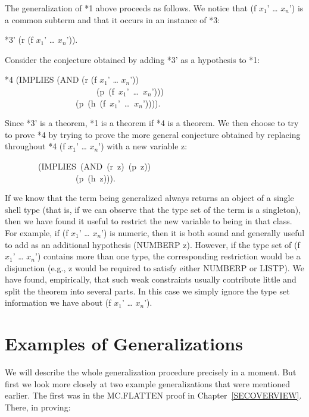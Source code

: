 \documentclass[10pt]{book}
\newenvironment{pubasis}{\begin{flushleft}}{\end{flushleft}}
\begin{document}
The generalization of *1 above proceeds as follows.
We notice that (f $x_{1}$' \ldots{} $x_{n}$') is a common subterm and that
it occurs in an instance of *3:
\begin{pubasis}
*3'	(r (f $x_{1}$' \ldots{} $x_{n}$')).\\
\end{pubasis}
Consider the conjecture obtained by adding *3' as a
hypothesis to *1:
\begin{pubasis}
*4	(IMPLIES (AND (r (f $x_{1}$' \ldots{} $x_{n}$'))\\
~~~~~~~~~~~~~~~~~~~~~~(p~(f~$x_{1}$'~\ldots{}~$x_{n}$')))\\
~~~~~~~~~~~~~~~~~(p~(h~(f~$x_{1}$'~\ldots{}~$x_{n}$')))).\\
\end{pubasis}
Since *3' is a theorem, *1 is a theorem if *4 is
a theorem.  We then choose to try to prove *4 by trying
to prove the more
general conjecture obtained by replacing throughout
*4 (f $x_{1}$' \ldots{} $x_{n}$') with a new variable z:
\begin{pubasis}
~~~~~~~~(IMPLIES~(AND~(r~z)~(p~z))\\
~~~~~~~~~~~~~~~~~(p~(h~z))).\\
\end{pubasis}
If we know that the term being generalized always
returns an object of a single shell type (that is, if we can observe
that the type set of the term is a singleton), then we have found it
useful to restrict the new variable to being in that class.
For example, if (f $x_{1}$' \ldots{} $x_{n}$') is numeric,
then it is both sound and generally useful to add as an additional
hypothesis (NUMBERP z).  However, if the type set of
(f $x_{1}$' \ldots{} $x_{n}$') contains more than one type,
the corresponding restriction would be a disjunction
(e.g., z would be  required
to satisfy either NUMBERP or LISTP).
We have found, empirically, that such weak constraints usually contribute little
and  split the theorem into several parts.  In this case we
simply ignore the type set information we have about (f $x_{1}$' \ldots{} $x_{n}$').

\section{Examples of Generalizations}
We will describe the whole generalization procedure precisely in a moment.
But first we  look more closely at two example generalizations that
were mentioned earlier.  The first
was in the MC.FLATTEN proof in Chapter~\ref{SECOVERVIEW}.  There, in
proving:
\end{document}
